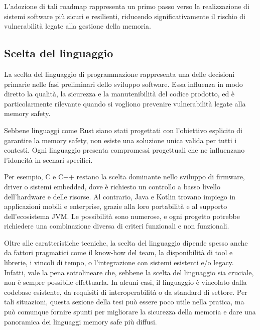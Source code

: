L'adozione di tali roadmap rappresenta un primo passo verso la realizzazione di sistemi
software più sicuri e resilienti, riducendo significativamente il rischio di
vulnerabilità legate alla gestione della memoria.

\subsection{Scelta del linguaggio}
\label{sec:linguaggio}

La scelta del linguaggio di programmazione rappresenta una delle decisioni primarie
nelle fasi preliminari dello sviluppo software. Essa influenza in modo diretto
la qualità, la sicurezza e la manutenibilità del codice prodotto, ed è
particolarmente rilevante quando si vogliono prevenire vulnerabilità legate alla
memory safety.

Sebbene linguaggi come Rust siano stati progettati con l'obiettivo esplicito di
garantire la memory safety, non esiste una soluzione unica valida per tutti i contesti.
Ogni linguaggio presenta compromessi progettuali che ne influenzano l'idoneità
in scenari specifici.

Per esempio, C e C++ restano la scelta dominante nello sviluppo di firmware,
driver o sistemi embedded, dove è richiesto un controllo a basso livello dell'hardware
e delle risorse. Al contrario, Java e Kotlin trovano impiego in applicazioni mobili
e enterprise, grazie alla loro portabilità e al supporto dell'ecosistema JVM. Le
possibilità sono numerose, e ogni progetto potrebbe richiedere una combinazione
diversa di criteri funzionali e non funzionali.

Oltre alle caratteristiche tecniche, la scelta del linguaggio dipende spesso anche
da fattori pragmatici come il know-how del team, la disponibilità di tool e
librerie, i vincoli di tempo, o l'integrazione con sistemi esistenti e/o legacy.
Infatti, vale la pena sottolineare che, sebbene la scelta del linguaggio sia cruciale,
non è sempre possibile effettuarla. In alcuni casi, il linguaggio è vincolato
dalla codebase esistente, da requisiti di interoperabilità o da standard di settore.
Per tali situazioni, questa sezione della tesi può essere poco utile nella pratica,
ma può comunque fornire spunti per migliorare la sicurezza della memoria e dare
una panoramica dei linguaggi memory safe più diffusi.

